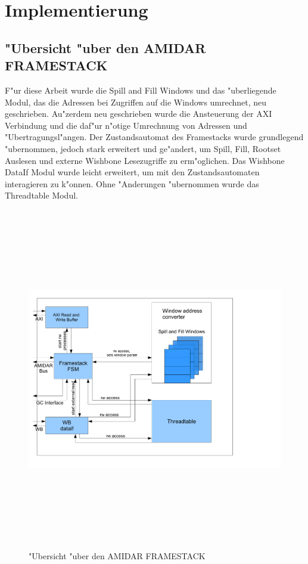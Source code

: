 \chapter{Implementierung}
\label{cha:Implementierung}

\section{"Ubersicht "uber den AMIDAR FRAMESTACK}
F"ur diese Arbeit wurde die Spill and Fill Windows und das "uberliegende Modul, das die Adressen bei Zugriffen auf die Windows umrechnet, neu geschrieben. Au"zerdem neu geschrieben wurde die Ansteuerung der AXI Verbindung und die daf"ur n"otige Umrechnung von Adressen und "Ubertragungsl"angen. Der Zustandsautomat des Framestacks wurde grundlegend "ubernommen, jedoch stark erweitert und ge"andert, um Spill, Fill, Rootset Auslesen und externe Wishbone Lesezugriffe zu erm"oglichen. Das Wishbone DataIf Modul wurde leicht erweitert, um mit den Zustandsautomaten interagieren zu k"onnen. Ohne "Anderungen "ubernommen wurde das Threadtable Modul.

\begin{figure}[H]
	\centering
	\includegraphics[height = 15cm]{PS_RS_graphics/Framestack_impl_overview.pdf}
	\caption{"Ubersicht "uber den AMIDAR FRAMESTACK}
\end{figure}
